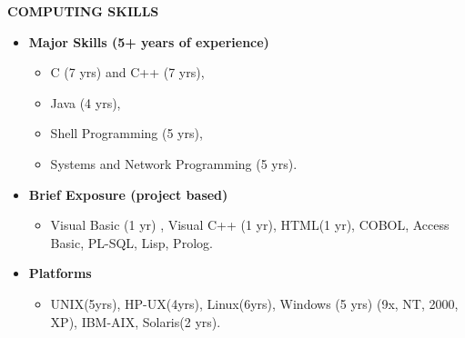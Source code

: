 \begin{resume}
{\bf COMPUTING SKILLS} 
    \begin{itemize}
         \item {\bf Major Skills (5+ years of experience)}
         \begin{itemize}
                \item[] C (7 yrs) and C++ (7 yrs), 
	        \item[] Java (4 yrs),
	        \item[] Shell Programming (5 yrs),
	        \item[] Systems and Network Programming (5 yrs).
         \end{itemize}
         \item {\bf Brief Exposure (project based)}
         \begin{itemize}
                \item[] Visual Basic (1 yr) , Visual C++ (1 yr), HTML(1 yr), COBOL, Access Basic, PL-SQL, Lisp, Prolog.
         \end{itemize}
         \item {\bf Platforms}
         \begin{itemize}
                \item[] UNIX(5yrs), HP-UX(4yrs), Linux(6yrs), Windows (5 yrs) (9x, NT, 2000, XP), IBM-AIX, Solaris(2 yrs).
         \end{itemize}
    \end{itemize}
 
\end{resume}































